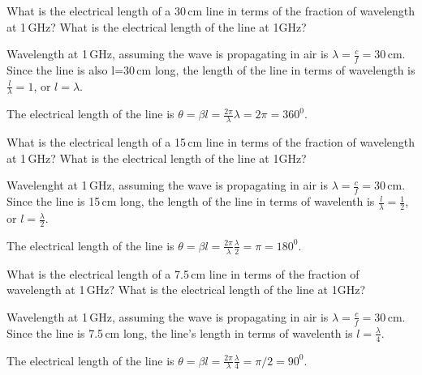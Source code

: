 \documentclass{ximera}
\begin{document}
\begin{example}
What is the electrical length of a 30\,cm line in terms of the fraction of wavelength at 1\,GHz? What is the electrical length of the line at 1GHz?
\begin{explanation}
Wavelength at 1\,GHz, assuming the wave is propagating in air is $\lambda=\frac{c}{f}=30$\,cm. Since the line is also l=30\,cm long, the length of the line in terms of wavelength is $\frac{l}{\lambda}=1$, or $l=\lambda$.

The electrical length of the line is $\theta=\beta l = \frac{2 \pi}{\lambda} \lambda= 2 \pi = 360^0$.

\end{explanation}

\end{example}


\begin{example}
What is the electrical length of a 15\,cm line in terms of the fraction of wavelength at 1\,GHz? What is the electrical length of the line at 1GHz?
\begin{explanation}
Wavelenght at 1\,GHz, assuming the wave is propagating in air is $\lambda=\frac{c}{f}=30$\,cm. Since the line is 15\,cm long, the length of the line in terms of wavelenth is $\frac{l}{\lambda}=\frac{1}{2}$, or $l=\frac{\lambda}{2}$.

The electrical length of the line is $\theta=\beta l = \frac{2 \pi}{\lambda} \frac{\lambda}{2} =  \pi = 180^0$.


\end{explanation}

\end{example}


\begin{example}
What is the electrical length of a 7.5\,cm line in terms of the fraction of wavelength at 1\,GHz? What is the electrical length of the line at 1GHz?
\begin{explanation}
Wavelength at 1\,GHz, assuming the wave is propagating in air is $\lambda=\frac{c}{f}=30$\,cm. Since the line is 7.5\,cm long, the line's length in terms of wavelenth is $l=\frac{\lambda}{4}$.

The electrical length of the line is $\theta=\beta l = \frac{2 \pi}{\lambda} \frac{\lambda}{4} =  \pi/2 = 90^0$.


\end{explanation}

\end{example}
\end{document}
